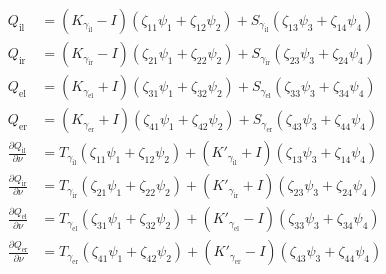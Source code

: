 \begin{align*}
  Q_\text{il} &= (K_{\gamma_\text{il}}-I) (\zeta_{11}\psi_1 + \zeta_{12}\psi_2) + S_{\gamma_\text{il}} (\zeta_{13} \psi_3 + \zeta_{14}\psi_4) \\
  Q_\text{ir} &= (K_{\gamma_\text{ir}}-I) (\zeta_{21}\psi_1 + \zeta_{22}\psi_2) + S_{\gamma_\text{ir}} (\zeta_{23} \psi_3 + \zeta_{24}\psi_4) \\
  Q_\text{el} &= (K_{\gamma_\text{el}} + I) (\zeta_{31}\psi_1 + \zeta_{32}\psi_2) + S_{\gamma_\text{el}} (\zeta_{33} \psi_3 + \zeta_{34}\psi_4) \\
  Q_\text{er} &= (K_{\gamma_\text{er}} + I) (\zeta_{41}\psi_1 + \zeta_{42}\psi_2) + S_{\gamma_\text{er}} (\zeta_{43} \psi_3 + \zeta_{44}\psi_4) \\
  \frac{\partial Q_\text{il}}{\partial\nu} &= T_{\gamma_\text{il}} (\zeta_{11}\psi_1 + \zeta_{12}\psi_2) + (K'_{\gamma_\text{il}} + I) (\zeta_{13} \psi_3 + \zeta_{14}\psi_4)\\
  \frac{\partial Q_\text{ir}}{\partial\nu} &= T_{\gamma_\text{ir}} (\zeta_{21}\psi_1 + \zeta_{22}\psi_2) + (K'_{\gamma_\text{ir}} + I) (\zeta_{23} \psi_3 + \zeta_{24}\psi_4)\\
  \frac{\partial Q_\text{el}}{\partial\nu} &= T_{\gamma_\text{el}} (\zeta_{31}\psi_1 + \zeta_{32}\psi_2) + (K'_{\gamma_\text{el}} - I) (\zeta_{33} \psi_3 + \zeta_{34}\psi_4)\\
  \frac{\partial Q_\text{er}}{\partial\nu} &= T_{\gamma_\text{er}} (\zeta_{41}\psi_1 + \zeta_{42}\psi_2) + (K'_{\gamma_\text{er}} - I) (\zeta_{43} \psi_3 + \zeta_{44}\psi_4)\\
\end{align*}

